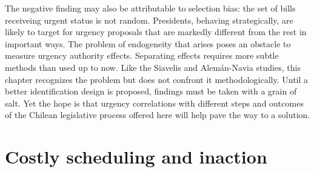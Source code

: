 \documentclass[letter,12pt]{article}
\begin{document}
The negative finding may also be attributable to selection bias: the set of bills receiveing urgent status is not random. Presidents, behaving strategically, are likely to target for urgency proposals that are markedly different from the rest in important ways. The problem of endogeneity that arises poses an obstacle to measure urgency authority effects. Separating effects requires more subtle methods than used up to now. Like the Siavelis and Alem\'an-Navia studies, this chapter recognizes the problem but does not confront it methodologically. Until a better identification design is proposed, findings must be taken with a grain of salt. Yet the hope is that urgency correlations with different steps and outcomes of the Chilean legislative process offered here will help pave the way to a solution. 




\section{Costly scheduling and inaction}
\end{document}
